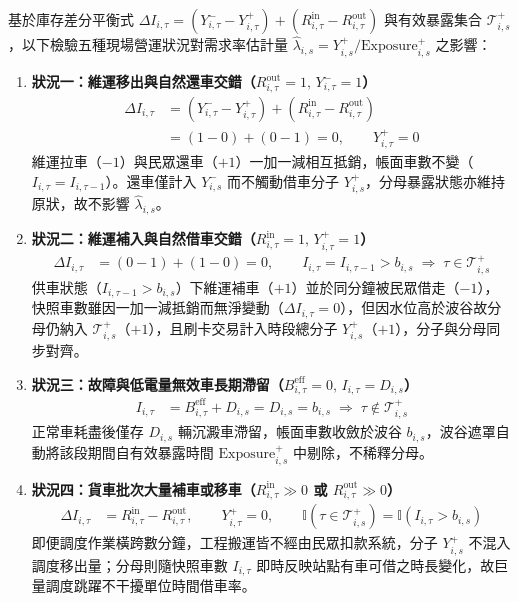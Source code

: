 基於庫存差分平衡式 $\Delta I_{i,\tau} = (Y^-_{i,\tau} - Y^+_{i,\tau}) + (R^{\text{in}}_{i,\tau} - R^{\text{out}}_{i,\tau})$ 與有效暴露集合 $\mathcal{T}^+_{i,s}$，以下檢驗五種現場營運狀況對需求率估計量 $\hat{\lambda}_{i,s} = Y^+_{i,s} / \text{Exposure}^+_{i,s}$ 之影響：

\begin{enumerate}
    \item \textbf{狀況一：維運移出與自然還車交錯（$R^{\text{out}}_{i,\tau} = 1, \, Y^-_{i,\tau} = 1$）}
    \begin{equation}
    \begin{aligned}
    \Delta I_{i,\tau} &= \left(Y^-_{i,\tau} - Y^+_{i,\tau}\right) + \left(R^{\text{in}}_{i,\tau} - R^{\text{out}}_{i,\tau}\right) \\
    &= (1 - 0) + (0 - 1) = 0, \qquad Y^+_{i,\tau} = 0
    \end{aligned}
    \end{equation}
    維運拉車（$-1$）與民眾還車（$+1$）一加一減相互抵銷，帳面車數不變（$I_{i,\tau} = I_{i,\tau-1}$）。還車僅計入 $Y^-_{i,s}$ 而不觸動借車分子 $Y^+_{i,s}$，分母暴露狀態亦維持原狀，故不影響 $\hat{\lambda}_{i,s}$。

    \item \textbf{狀況二：維運補入與自然借車交錯（$R^{\text{in}}_{i,\tau} = 1, \, Y^+_{i,\tau} = 1$）}
    \begin{align}
    \Delta I_{i,\tau} &= (0 - 1) + (1 - 0) = 0, \qquad I_{i,\tau} = I_{i,\tau-1} > b_{i,s} \;\Rightarrow\; \tau \in \mathcal{T}^+_{i,s}
    \end{align}
    供車狀態（$I_{i,\tau-1} > b_{i,s}$）下維運補車（$+1$）並於同分鐘被民眾借走（$-1$），快照車數雖因一加一減抵銷而無淨變動（$\Delta I_{i,\tau} = 0$），但因水位高於波谷故分母仍納入 $\mathcal{T}^+_{i,s}$（$+1$），且刷卡交易計入時段總分子 $Y^+_{i,s}$（$+1$），分子與分母同步對齊。

    \item \textbf{狀況三：故障與低電量無效車長期滯留（$B^{\text{eff}}_{i,\tau} = 0, \, I_{i,\tau} = D_{i,s}$）}
    \begin{align}
    I_{i,\tau} &= B^{\text{eff}}_{i,\tau} + D_{i,s} = D_{i,s} = b_{i,s} \;\Rightarrow\; \tau \notin \mathcal{T}^+_{i,s}
    \end{align}
    正常車耗盡後僅存 $D_{i,s}$ 輛沉澱車滯留，帳面車數收斂於波谷 $b_{i,s}$，波谷遮罩自動將該段期間自有效暴露時間 $\text{Exposure}^+_{i,s}$ 中剔除，不稀釋分母。

    \item \textbf{狀況四：貨車批次大量補車或移車（$R^{\text{in}}_{i,\tau} \gg 0$ 或 $R^{\text{out}}_{i,\tau} \gg 0$）}
    \begin{align}
    \Delta I_{i,\tau} &= R^{\text{in}}_{i,\tau} - R^{\text{out}}_{i,\tau}, \qquad Y^+_{i,\tau} = 0, \qquad \mathbb{I}\left(\tau \in \mathcal{T}^+_{i,s}\right) = \mathbb{I}\left(I_{i,\tau} > b_{i,s}\right)
    \end{align}
    即便調度作業橫跨數分鐘，工程搬運皆不經由民眾扣款系統，分子 $Y^+_{i,s}$ 不混入調度移出量；分母則隨快照車數 $I_{i,\tau}$ 即時反映站點有車可借之時長變化，故巨量調度跳躍不干擾單位時間借車率。


\end{enumerate}
